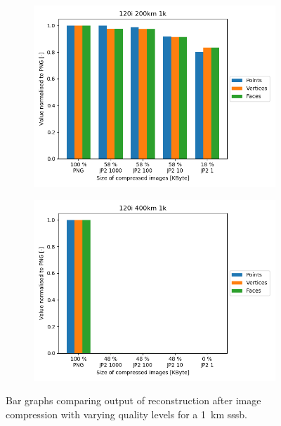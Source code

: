 \begin{figure}[htb]
        \begin{subfigure}[b]{0.49\textwidth}
            \centering
            \includegraphics[width=\textwidth]{doc/thesis/0_figures/recon/120i_200km_1k.png}
            \caption{}
            \label{fig:recon_120_200_1}
        \end{subfigure}
        \begin{subfigure}[b]{0.49\textwidth}
            \centering
            \includegraphics[width=\textwidth]{doc/thesis/0_figures/recon/120i_400km_1k.png}
            \caption{}
            \label{fig:recon_120_400_1}
        \end{subfigure}
    \caption{Bar graphs comparing output of reconstruction after image compression with varying quality levels for a \SI{1}{\kilo\meter} \gls{sssb}.}
    \label{fig:recon_stats_1}
\end{figure}

